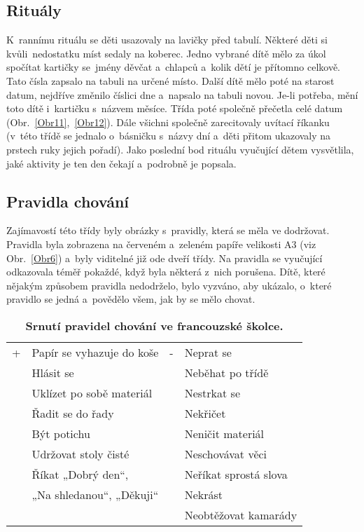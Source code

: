 		\subsection{Rituály}
		\label{ritualy}
			K~rannímu rituálu se děti usazovaly na lavičky před tabulí. Některé děti si kvůli nedostatku míst sedaly na koberec. Jedno vybrané dítě mělo za úkol spočítat kartičky se jmény děvčat a~chlapců a~kolik dětí je přítomno celkově. Tato čísla zapsalo na tabuli na určené místo. Další dítě mělo poté na starost datum, nejdříve změnilo číslici dne a~napsalo na tabuli novou. Je-li potřeba, mění toto dítě i~kartičku s~názvem měsíce. Třída poté společně přečetla celé datum (Obr.~\ref{Obr11},~\ref{Obr12}). Dále všichni společně zarecitovaly uvítací říkanku (v~této třídě se jednalo o~básničku s názvy dní a~děti přitom ukazovaly na prstech ruky jejich pořadí). Jako poslední bod rituálu vyučující dětem vysvětlila, jaké aktivity je ten den čekají a~podrobně je popsala. 

		\subsection{Pravidla chování}
		\label{pravidlaChovani}
			Zajímavostí této třídy byly obrázky s~pravidly, která se měla ve dodržovat. Pravidla byla zobrazena na červeném a~zeleném papíře velikosti A3 (viz Obr.~\ref{Obr6}) a~byly viditelné již ode dveří třídy. Na pravidla se vyučující odkazovala téměř pokaždé, když byla některá z nich porušena. Dítě, které nějakým způsobem pravidla nedodrželo, bylo vyzváno, aby ukázalo, o~které pravidlo se jedná a povědělo všem, jak by se mělo chovat. 

			\begin{spacing}{1.0}
			\begin{table}[h!]
				\center
				\begin{tabular}{|ll|ll|}
					\hline
					\rowcolor{grey!0}
				+	& Papír se vyhazuje do koše						& -	& Neprat se 			\\
					& Hlásit se 									&  	& Neběhat po třídě		\\
					& Uklízet po sobě materiál 						&	& Nestrkat se 			\\
					& Řadit se do řady 								&	& Nekřičet 				\\
					& Být potichu 									& 	& Neničit materiál 		\\
					& Udržovat stoly čisté 							& 	& Neschovávat věci 		\\
					& Říkat „Dobrý den“,							&	& Neříkat sprostá slova \\
					&  „Na shledanou“, „Děkuji“						&	& Nekrást				\\
					&												&	& Neobtěžovat kamarády 	\\
					\hline
				\end{tabular}
				\caption{ \textbf{Srnutí pravidel chování ve francouzské školce.}}
			\label{tab:pravidlaFR}
			\end{table}
			\end{spacing}

